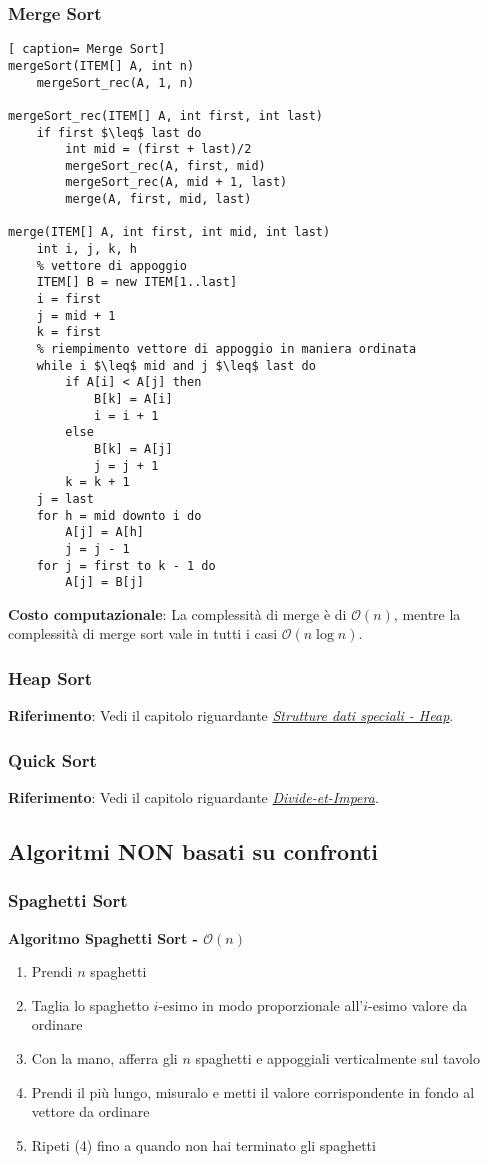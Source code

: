 \documentclass[../cheatSheetAlgoritmi.tex]{subfiles}
\begin{document}
\subsubsection{Merge Sort}
\begin{lstlisting}[ caption= Merge Sort]
mergeSort(ITEM[] A, int n)
	mergeSort_rec(A, 1, n)

mergeSort_rec(ITEM[] A, int first, int last)
  	if first $\leq$ last do
		int mid = (first + last)/2
		mergeSort_rec(A, first, mid)
		mergeSort_rec(A, mid + 1, last)
		merge(A, first, mid, last)

merge(ITEM[] A, int first, int mid, int last)
  	int i, j, k, h
  	% vettore di appoggio
  	ITEM[] B = new ITEM[1..last]
  	i = first
  	j = mid + 1
  	k = first
  	% riempimento vettore di appoggio in maniera ordinata
  	while i $\leq$ mid and j $\leq$ last do
		if A[i] < A[j] then
			B[k] = A[i]
			i = i + 1
		else  
			B[k] = A[j]
			j = j + 1
		k = k + 1
	j = last
  	for h = mid downto i do
  		A[j] = A[h]
  		j = j - 1
  	for j = first to k - 1 do
  		A[j] = B[j]
\end{lstlisting}
\textbf{Costo computazionale}: La complessità di merge è di $\mathcal{O}(n)$, mentre la complessità di merge sort vale in tutti i casi $\mathcal{O}(n\log{}n)$.\
\subsubsection{Heap Sort}
\textbf{Riferimento}: Vedi il capitolo riguardante \hyperref[sec:heap]{\emph{Strutture dati speciali - Heap}}.
\subsubsection{Quick Sort}
\textbf{Riferimento}: Vedi il capitolo riguardante \hyperref[sec:quicksort]{\emph{Divide-et-Impera}}.

\subsection{Algoritmi NON basati su confronti}
\subsubsection{Spaghetti Sort}
\textbf{Algoritmo Spaghetti Sort - $\mathcal{O}(n)$}
\begin{enumerate}
	\item Prendi $n$ spaghetti
	\item Taglia lo spaghetto $i$-esimo in modo proporzionale all'$i$-esimo valore da ordinare
	\item Con la mano, afferra gli $n$ spaghetti e appoggiali verticalmente sul tavolo
	\item Prendi il più lungo, misuralo e metti il valore corrispondente in fondo al vettore da ordinare
	\item Ripeti (4) fino a quando non hai terminato gli spaghetti
\end{enumerate}
\end{document}
